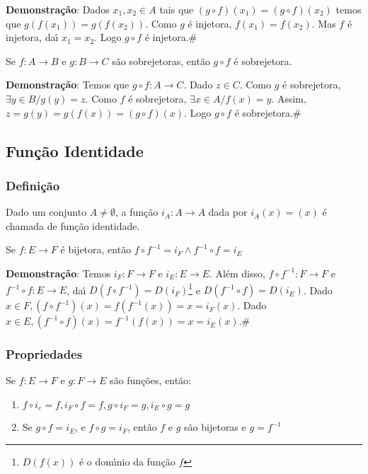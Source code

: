 \textbf{Demonstra{\c c}{\~a}o}: Dados $x_{1},x_{2}\in A$ tais que $(g\circ f)(x_{1})=(g\circ f)(x_{2})$ temos que $g(f(x_{1}))=g(f(x_{2}))$. Como $g$ {\'e} injetora, $f(x_{1})=f(x_{2})$. Mas $f$ {\'e} injetora, da{\'\i} $x_{1}=x_{2}$. Logo $g\circ f$ {\'e} injetora.\#

\begin{proposicao} Se $f:A\rightarrow B$ e $g:B\rightarrow C$ s{\~a}o sobrejetoras, ent{\~a}o $g\circ f$ {\'e} sobrejetora.\end{proposicao}

\textbf{Demonstra{\c c}{\~a}o}: Temos que $g\circ f:A\rightarrow C$. Dado $z\in C$. Como $g$ {\'e} sobrejetora, $\exists y\in B/g(y)=z$. Como $f$ {\'e} sobrejetora, $\exists x\in A/f(x)=y$. Assim, $z=g(y)=g(f(x))=(g\circ f)(x)$. Logo $g\circ f$ {\'e} sobrejetora.\#

\subsection{Fun{\c c}{\~a}o Identidade}
\subsubsection{Defini{\c c}{\~a}o}
\begin{definicao} Dado um conjunto $A\neq\emptyset$, a fun{\c c}{\~a}o $i_{A}:A\rightarrow A$ dada por $i_{A}(x)=(x)$ {\'e} chamada de fun{\c c}{\~a}o identidade.\end{definicao}

\begin{proposicao} Se $f:E\rightarrow F$ {\'e} bijetora, ent{\~a}o $f\circ f^{-1}=i_{F}\wedge f^{-1}\circ f=i_{E}$\end{proposicao}

\textbf{Demonstra{\c c}{\~a}o}: Temos $i_{F}:F\rightarrow F$ e $i_{E}:E\rightarrow E$. Al{\'e}m disso, $f\circ f^{-1}:F\rightarrow F$ e $f^{-1}\circ f:E\rightarrow E$, da{\'\i} $D(f\circ f^{-1})=D(i_{F})$\footnote{$D(f(x))$ {\'e} o dom{\'\i}nio da fun{\c c}{\~a}o $f$} e $D(f^{-1}\circ f)=D(i_{E})$. Dado $x\in F, (f\circ f^{-1})(x)=f(f^{-1}(x))=x=i_{F}(x)$. Dado $x\in E, (f^{-1}\circ f)(x)=f^{-1}(f(x))=x=i_{E}(x)$.\#

\subsubsection{Propriedades}
\begin{proposicao} Se $f:E\rightarrow F$ e $g:F\rightarrow E$ s{\~a}o fun{\c c}{\~o}es, ent{\~a}o:
\begin{enumerate}
\item $f\circ i_{e}=f, i_{F}\circ f=f, g\circ i_{F}=g, i_{E}\circ g=g$
\item Se $g\circ f=i_{E}$, e $f\circ g=i_{F}$, ent{\~a}o $f$ e $g$ s{\~a}o bijetoras e $g=f^{-1}$
\end{enumerate}
\end{proposicao}

